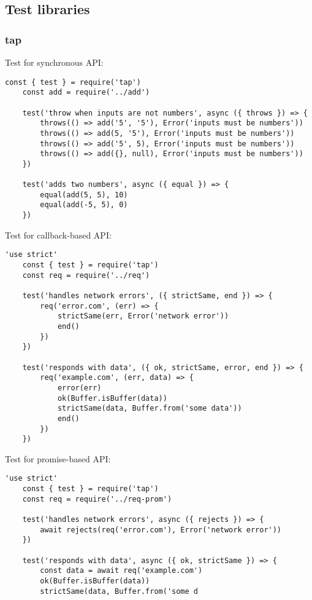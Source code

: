 \documentclass{scrartcl}
\begin{document}
\subsection{Test libraries}
\subsubsection{tap}

Test for synchronous API:

\begin{lstlisting}[style=ES6]
    const { test } = require('tap')
    const add = require('../add')

    test('throw when inputs are not numbers', async ({ throws }) => {
        throws(() => add('5', '5'), Error('inputs must be numbers'))
        throws(() => add(5, '5'), Error('inputs must be numbers'))
        throws(() => add('5', 5), Error('inputs must be numbers'))
        throws(() => add({}, null), Error('inputs must be numbers'))
    })

    test('adds two numbers', async ({ equal }) => {
        equal(add(5, 5), 10)
        equal(add(-5, 5), 0)
    })
\end{lstlisting}

Test for callback-based API:

\begin{lstlisting}[style=ES6]
    'use strict'
    const { test } = require('tap')
    const req = require('../req')

    test('handles network errors', ({ strictSame, end }) => {
        req('error.com', (err) => {
            strictSame(err, Error('network error'))
            end()
        })
    })

    test('responds with data', ({ ok, strictSame, error, end }) => {
        req('example.com', (err, data) => {
            error(err)
            ok(Buffer.isBuffer(data))
            strictSame(data, Buffer.from('some data'))
            end()
        })
    })
\end{lstlisting}

Test for promise-based API:

\begin{lstlisting}[style=ES6]
    'use strict'
    const { test } = require('tap')
    const req = require('../req-prom')

    test('handles network errors', async ({ rejects }) => {
        await rejects(req('error.com'), Error('network error'))
    })

    test('responds with data', async ({ ok, strictSame }) => {
        const data = await req('example.com')
        ok(Buffer.isBuffer(data))
        strictSame(data, Buffer.from('some d
\end{lstlisting}
\end{document}
